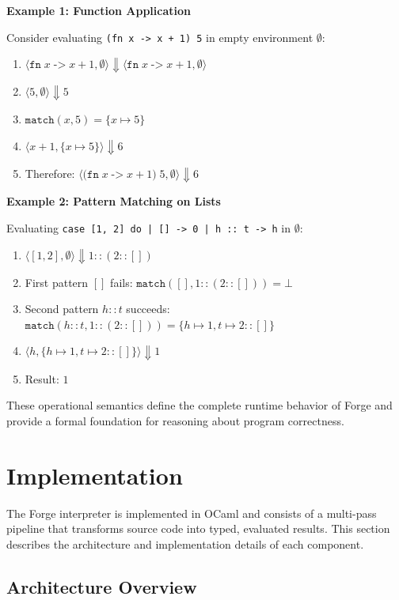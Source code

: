 \documentclass[conference,onecolumn]{IEEEtran}
\begin{document}
\textbf{Example 1: Function Application}

Consider evaluating \texttt{(fn x -> x + 1) 5} in empty environment $\emptyset$:

\begin{enumerate}
\item $\langle \texttt{fn} \; x \; \texttt{->} \; x + 1, \emptyset \rangle \Downarrow \langle \texttt{fn} \; x \; \texttt{->} \; x + 1, \emptyset \rangle$
\item $\langle 5, \emptyset \rangle \Downarrow 5$
\item $\texttt{match}(x, 5) = \{x \mapsto 5\}$
\item $\langle x + 1, \{x \mapsto 5\} \rangle \Downarrow 6$
\item Therefore: $\langle \texttt{(fn} \; x \; \texttt{->} \; x + 1) \; 5, \emptyset \rangle \Downarrow 6$
\end{enumerate}

\textbf{Example 2: Pattern Matching on Lists}

Evaluating \texttt{case [1, 2] do | [] -> 0 | h :: t -> h} in $\emptyset$:

\begin{enumerate}
\item $\langle [1, 2], \emptyset \rangle \Downarrow 1 :: (2 :: [])$
\item First pattern $[]$ fails: $\texttt{match}([], 1 :: (2 :: [])) = \bot$
\item Second pattern $h :: t$ succeeds: $\texttt{match}(h :: t, 1 :: (2 :: [])) = \{h \mapsto 1, t \mapsto 2 :: []\}$
\item $\langle h, \{h \mapsto 1, t \mapsto 2 :: []\} \rangle \Downarrow 1$
\item Result: $1$
\end{enumerate}

These operational semantics define the complete runtime behavior of Forge and provide a formal foundation for reasoning about program correctness.

\newpage
\section{Implementation}

The Forge interpreter is implemented in OCaml and consists of a multi-pass pipeline that transforms source code into typed, evaluated results. This section describes the architecture and implementation details of each component.

\subsection{Architecture Overview}
\end{document}
